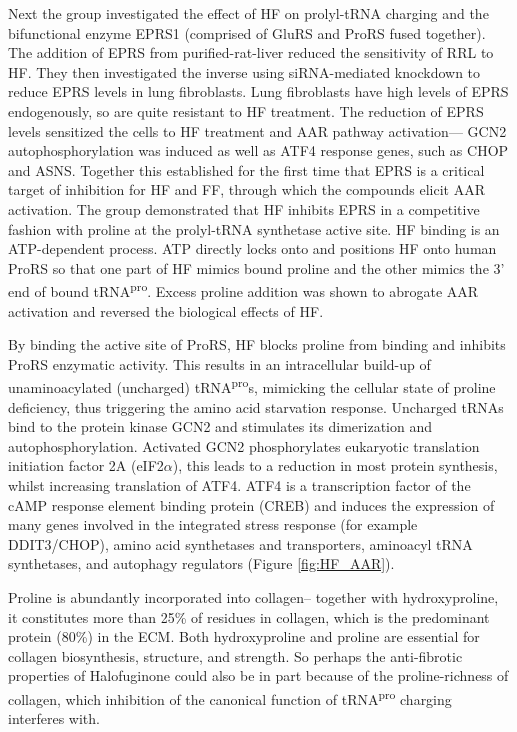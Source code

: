Next the group investigated the effect of HF on prolyl-tRNA charging and the bifunctional enzyme EPRS1 (comprised of GluRS and ProRS fused together).
The addition of EPRS from purified-rat-liver reduced the sensitivity of RRL to HF.
They then investigated the inverse using siRNA-mediated knockdown to reduce EPRS levels in lung fibroblasts.
Lung fibroblasts have high levels of EPRS endogenously, so are quite resistant to HF treatment.
The reduction of EPRS levels sensitized the cells to HF treatment and AAR pathway activation--- GCN2 autophosphorylation was induced as well as ATF4 response genes, such as CHOP and ASNS\@.
Together this established for the first time that EPRS is a critical target of inhibition for HF and FF, through which the compounds elicit AAR activation.
The group demonstrated that HF inhibits EPRS in a competitive fashion with proline at the prolyl-tRNA synthetase active site.
HF binding is an ATP-dependent process.
ATP directly locks onto and positions HF onto human ProRS so that one part of HF mimics bound proline and the other mimics the 3' end of bound tRNA\textsuperscript{pro}\cite{zhou2013atp}.
Excess proline addition was shown to abrogate AAR activation and reversed the biological effects of HF\cite{keller2012halofuginone}.

By binding the active site of ProRS, HF blocks proline from binding and inhibits ProRS enzymatic activity.
This results in an intracellular build-up of unaminoacylated (uncharged) tRNA\textsuperscript{pro}s, mimicking the cellular state of proline deficiency, thus triggering the amino acid starvation response.
Uncharged tRNAs bind to the protein kinase GCN2 and stimulates its dimerization and autophosphorylation.
Activated GCN2 phosphorylates eukaryotic translation initiation factor 2A (eIF2$\alpha$), this leads to a reduction in most protein synthesis, whilst increasing translation of ATF4.
ATF4 is a transcription factor of the cAMP response element binding protein (CREB) and induces the expression of many genes involved in the integrated stress response (for example DDIT3/CHOP), amino acid synthetases and transporters, aminoacyl tRNA synthetases, and autophagy regulators (Figure \ref{fig:HF_AAR})\cite{ye2015gcn2, sundrud2009halofuginone}.

Proline is abundantly incorporated into collagen-- together with hydroxyproline, it constitutes more than 25\% of residues in collagen, which is the predominant protein (80\%) in the ECM\cite{liu2013mirna}\@.
Both hydroxyproline and proline are essential for collagen biosynthesis, structure, and strength\cite{albaugh2017proline}.
So perhaps the anti-fibrotic properties of Halofuginone could also be in part because of the proline-richness of collagen, which inhibition of the canonical function of tRNA\textsuperscript{pro} charging interferes with.

